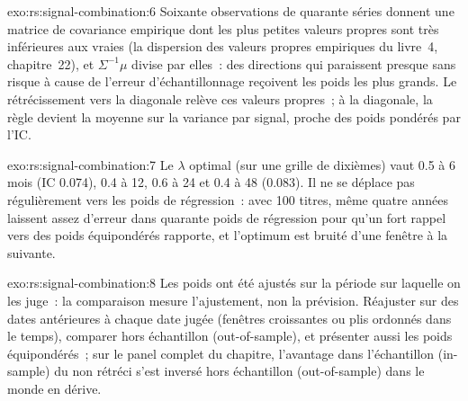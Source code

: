 \begin{solution}{exo:rs:signal-combination:6}
Soixante observations de quarante séries donnent une matrice de covariance empirique dont les plus petites valeurs propres sont très inférieures aux vraies (la dispersion des valeurs propres empiriques
du livre~4, chapitre~22), et $\Sigma^{-1}\mu$ divise par elles~: des directions qui paraissent presque sans risque à cause de l'erreur d'échantillonnage reçoivent les
poids les plus grands. Le rétrécissement vers la diagonale relève ces valeurs propres~; à la diagonale, la règle devient la moyenne sur la variance par signal, proche des poids pondérés par l'IC.
\end{solution}

\begin{solution}{exo:rs:signal-combination:7}
Le $\lambda$ optimal (sur une grille de dixièmes) vaut 0.5 à 6 mois (IC 0.074), 0.4 à 12, 0.6 à 24 et 0.4 à 48 (0.083). Il ne se déplace pas régulièrement vers
les poids de régression~: avec 100 titres, même quatre années laissent assez d'erreur dans quarante poids de régression pour qu'un fort rappel vers des poids équipondérés rapporte, et
l'optimum est bruité d'une fenêtre à la suivante.
\end{solution}

\begin{solution}{exo:rs:signal-combination:8}
Les poids ont été ajustés sur la période sur laquelle on les juge~: la comparaison mesure l'ajustement, non la prévision. Réajuster sur des dates antérieures à chaque date jugée
(fenêtres croissantes ou plis ordonnés dans le temps), comparer hors échantillon (out-of-sample), et présenter aussi les poids équipondérés~; sur le panel complet du chapitre, l'avantage dans l'échantillon (in-sample)
du  non rétréci s'est inversé hors échantillon (out-of-sample) dans le monde en dérive.
\end{solution}

